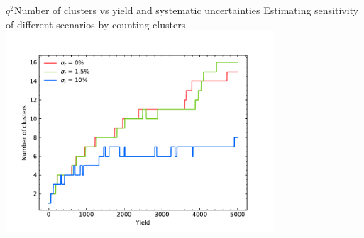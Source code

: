 %
\begin{frame}{$q^2$}{Number of clusters vs yield and systematic uncertainties}
	\centering
	Estimating sensitivity of different scenarios by counting clusters
	\includegraphics[width=10cm,clip,trim=0cm 0cm 0cm 1cm]{figures/from-paper/clust_yield.pdf}
\end{frame}
%
